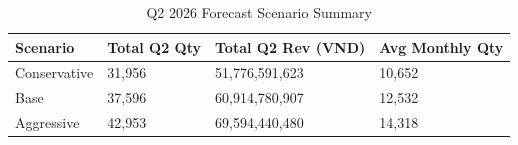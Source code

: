 \begin{table}[htbp]
\centering
\caption{Q2 2026 Forecast Scenario Summary}
\label{tab:scenario_summary}
\begin{tabular}{llll}
\toprule
\textbf{Scenario} & \textbf{Total Q2 Qty} & \textbf{Total Q2 Rev (VND)} & \textbf{Avg Monthly Qty} \\
\midrule
Conservative & 31,956 & 51,776,591,623 & 10,652 \\
Base & 37,596 & 60,914,780,907 & 12,532 \\
Aggressive & 42,953 & 69,594,440,480 & 14,318 \\
\bottomrule
\end{tabular}
\end{table}
